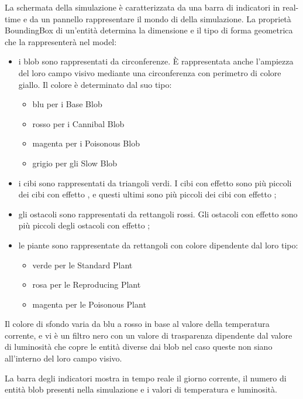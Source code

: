 La schermata della simulazione è caratterizzata da una barra di indicatori in real-time e da un pannello rappresentare il mondo di della simulazione. La proprietà BoundingBox di un'entità determina la dimensione e il tipo di forma geometrica che la rappresenterà nel model:

\begin{itemize}
	\item i blob sono rappresentati da circonferenze. È rappresentata anche l'ampiezza del loro campo visivo mediante una circonferenza con perimetro di colore giallo. Il colore è determinato dal suo tipo:
	\begin{itemize}
		\item blu per i Base Blob
		\item rosso per i Cannibal Blob
		\item magenta per i Poisonous Blob
		\item grigio per gli Slow Blob
	\end{itemize}
	\item i cibi sono rappresentati da triangoli verdi. I cibi con effetto  sono più piccoli dei cibi con effetto , e questi ultimi sono più piccoli dei cibi con effetto ;
	\item gli ostacoli sono rappresentati da rettangoli rossi. Gli ostacoli con effetto  sono più piccoli degli ostacoli con effetto ;
	\item le piante sono rappresentate da rettangoli con colore dipendente dal loro tipo:
	\begin{itemize}
		\item verde per le Standard Plant
		\item rosa per le Reproducing Plant
		\item magenta per le Poisonous Plant
	\end{itemize}
\end{itemize}

Il colore di sfondo varia da blu a rosso in base al valore della temperatura corrente, e vi è un filtro nero con un valore di trasparenza dipendente dal valore di luminosità che copre le entità diverse dai blob nel caso queste non siano all'interno del loro campo visivo.

La barra degli indicatori mostra in tempo reale il giorno corrente, il numero di entità blob presenti nella simulazione e i valori di temperatura e luminosità.

